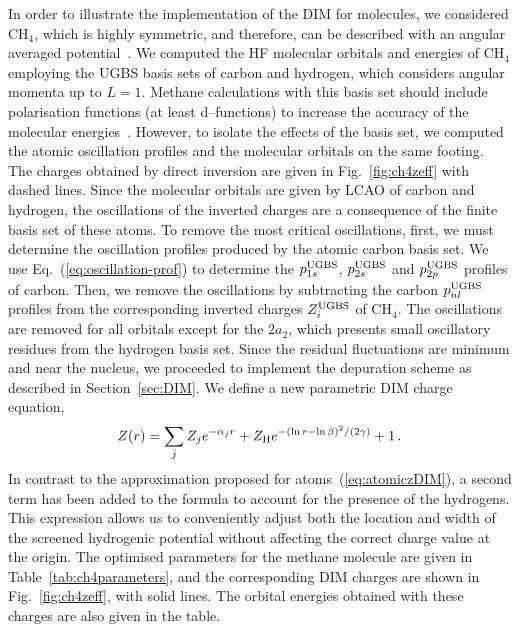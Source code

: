 \documentclass[10pt]{article}
\begin{document}
In order to illustrate the implementation of the DIM for molecules, 
we considered CH$_4$, which is highly symmetric, and therefore, can 
be described with an angular averaged potential~\cite{Granados2016}. 
We computed the HF molecular orbitals and energies of CH$_4$ 
employing the UGBS basis sets of carbon and hydrogen, which considers 
angular momenta up to $L=1$. Methane calculations with this basis set 
should include polarisation functions (at least d--functions) to 
increase the accuracy of the molecular 
energies~\cite{Rothenberg1971,Hariharan1972}. However, to isolate the 
effects of the basis set, we computed the atomic oscillation profiles 
and the molecular orbitals on the same footing. The charges obtained 
by direct inversion are given in Fig.~\ref{fig:ch4zeff} with dashed 
lines. Since the molecular orbitals are given by LCAO of carbon and 
hydrogen, the oscillations of the inverted charges are a consequence 
of the finite basis set of these atoms. To remove the most critical 
oscillations,  first, we must determine the oscillation profiles 
produced by the atomic carbon basis set. We use 
Eq.~(\ref{eq:oscillation-prof}) to determine the 
$p_{1s}^{\mbox{\scriptsize UGBS}}$, $p_{2s}^{\mbox{\scriptsize UGBS}}$ 
and $p_{2p}^{\mbox{\scriptsize UGBS}}$ profiles of carbon. Then, we 
remove the oscillations by subtracting the carbon 
$p_{nl}^{\mbox{\scriptsize UGBS}}$ profiles from the corresponding 
inverted charges $Z_{i}^{\mbox{\scriptsize UGBS}}$ of CH$_4$. The 
oscillations are removed for all orbitals except for the $2a_2$, 
which presents small oscillatory residues from the hydrogen basis 
set. Since the residual fluctuations are minimum and near the 
nucleus, we proceeded to implement the depuration scheme as described 
in Section~\ref{sec:DIM}. We define a new parametric DIM charge 
equation,
\begin{eqnarray}
 Z(r) = \sum_j Z_j e^{-\alpha_j r} 
 + Z_{\mbox{\scriptsize H}} e^{-(\ln r - \ln \beta)^2/(2\gamma)} 
 + 1\,.
 \label{eq:moleculezDIM}
\end{eqnarray}
In contrast to the approximation proposed for 
atoms~(\ref{eq:atomiczDIM}), a second term has been added to the 
formula to account for the presence of the hydrogens. This expression 
allows us to conveniently adjust both the location and width of the 
screened hydrogenic potential without affecting the correct charge value at the origin.
The optimised parameters for the methane molecule are given in 
Table~\ref{tab:ch4parameters}, and the corresponding DIM charges are 
shown in Fig.~\ref{fig:ch4zeff}, with solid lines. The orbital 
energies obtained with these charges are also given in the table.
\end{document}
